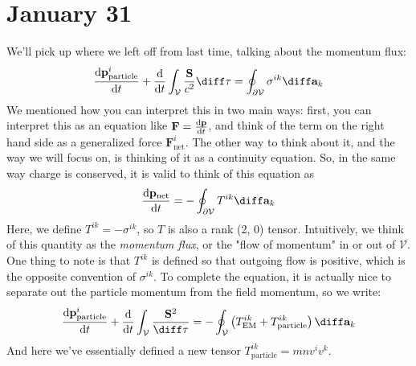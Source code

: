 \section{January 31}
We'll pick up where we left off from last time, talking about the momentum flux:
\[
	\dv{\mathbf{p}_\text{particle}^{i}}{t} + \dv{t} \int_{\mathcal{V}} \frac{\mathbf{S}}{c^2} \diff \tau =
	\oint_{\partial \mathcal{V}}\sigma^{ik} \diff \mathbf{a}_k
\]
We mentioned how you can interpret this in two main ways: first, you can interpret this as an equation like
\( \mathbf{F} = \dv{\mathbf{p}}{t} \), and think of the term on the right hand side as a generalized force \(
\mathbf{F}_\text{net}^{i}\). The other way to think about it, and the way we will focus on, is thinking of it
as a continuity equation. So, in the same way charge is conserved, it is valid to think of this equation as
\[
	\dv{\mathbf{p}_\text{net}}{t} = -\oint_{\partial \mathcal{V}} T^{ik} \diff \mathbf{a}_k
\]
Here, we define \( T^{ik} = - \sigma^{ik} \), so \( T \) is also a rank (2, 0) tensor. Intuitively, we think
of this quantity as the \textit{momentum flux}, or the "flow of momentum" in or out of \( \mathcal{V} \). One
thing to note is that \( T^{ik} \) is defined so that outgoing flow is positive, which is the opposite
convention of \( \sigma^{ik} \). To complete the equation, it is actually nice to separate out the particle
momentum from the field momentum, so we write:
\[
	\dv{\mathbf{p}_\text{particle}^{i}}{t} + \dv{t} \int_\mathcal{V} \frac{\mathbf{S}^2}{\diff \tau} =
	-\oint_{\mathcal{V}}\left(T_\text{EM}^{ik} + T_\text{particle}^{ik}\right) \diff \mathbf{a}_k
\]
And here we've essentially defined a new tensor \( T_\text{particle}^{ik} = mnv^{i}v^{k} \). 

